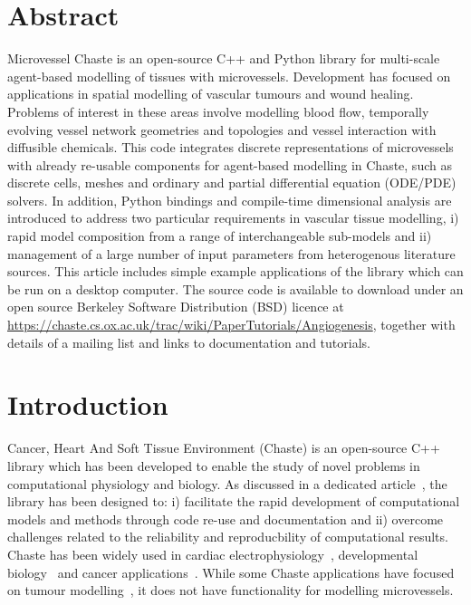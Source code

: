 \documentclass[10pt,letterpaper]{article}
\begin{document}
\section*{Abstract}
Microvessel Chaste is an open-source C++ and Python library for multi-scale agent-based modelling of tissues with microvessels. Development has focused on applications in spatial modelling of vascular tumours and wound healing. Problems of interest in these areas involve modelling blood flow, temporally evolving vessel network geometries and topologies and vessel interaction with diffusible chemicals. This code integrates discrete representations of microvessels with already re-usable components for agent-based modelling in Chaste, such as discrete cells, meshes and ordinary and partial differential equation (ODE/PDE) solvers. In addition, Python bindings and compile-time dimensional analysis are introduced to address two particular requirements in vascular tissue modelling, i) rapid model composition from a range of interchangeable sub-models and ii) management of a large number of input parameters from heterogenous literature sources. This article includes simple example applications of the library which can be run on a desktop computer. The source code is available to download under an open source Berkeley Software Distribution (BSD) licence at \url{https://chaste.cs.ox.ac.uk/trac/wiki/PaperTutorials/Angiogenesis}, together with details of a mailing list and links to documentation and tutorials.

\linenumbers

\section*{Introduction}
Cancer, Heart And Soft Tissue Environment (Chaste) is an open-source C++ library which has been developed to enable the study of novel problems in computational physiology and biology. As discussed in a dedicated article~\cite{Mirams2013}, the library has been designed to: i) facilitate the rapid development of computational models and methods through code re-use and documentation and ii) overcome challenges related to the reliability and reproducbility of computational results. Chaste has been widely used in cardiac electrophysiology~\cite{Cooper2015}, developmental biology~\cite{Tetley2016} and cancer applications~\cite{Dunn2016}. While some Chaste applications have focused on tumour modelling~\cite{Figueredo2013}, it does not have functionality for modelling microvessels. 
\end{document}
